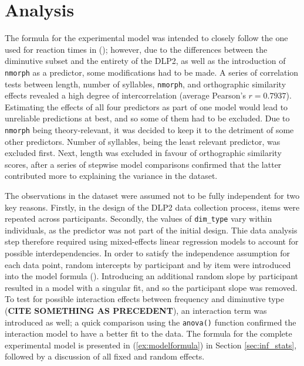 \section{Analysis}

The formula for the experimental model was intended to closely follow the one used for reaction times in \citeauthor{Brysbaert+etal+2016} (\citeyear{Brysbaert+etal+2016}); however, due to the differences between the diminutive subset and the entirety of the DLP2, as well as the introduction of \texttt{nmorph} as a predictor, some modifications had to be made. A series of correlation tests between length, number of syllables, \texttt{nmorph}, and orthographic similarity effects revealed a high degree of intercorrelation (average Pearson's $r=0.7937$). Estimating the effects of all four predictors as part of one model would lead to unreliable predictions at best, and so some of them had to be excluded. Due to \texttt{nmorph} being theory-relevant, it was decided to keep it to the detriment of some other predictors. Number of syllables, being the least relevant predictor, was excluded first. Next, length was excluded in favour of orthographic similarity scores, after a series of stepwise model comparisons confirmed that the latter contributed more to explaining the variance in the dataset.

 The observations in the dataset were assumed not to be fully independent for two key reasons.  Firstly, in the design of the DLP2 data collection process, items were repeated across participants. Secondly, the values of \texttt{dim\_type} vary within individuals, as the predictor was not part of the initial design. Thie data analysis step therefore required using mixed-effects linear regression models to account for possible interdependencies. In order to satisfy the independence assumption for each data point, random intercepts by participant and by item were introduced into the model formula (\cite{Winter+2019}). Introducing an additional random slope by participant resulted in a model with a singular fit, and so the participant slope was removed. To test for possible interaction effects between frequency and diminutive type (\textbf{CITE SOMETHING AS PRECEDENT}), an interaction term was introduced as well; a quick comparison using the \texttt{anova()} function confirmed the interaction model to have a better fit to the data. The formula for the complete experimental model is presented in (\ref{ex:modelformula}) in Section \ref{sec:inf_stats}, followed by a discussion of all fixed and random effects.

